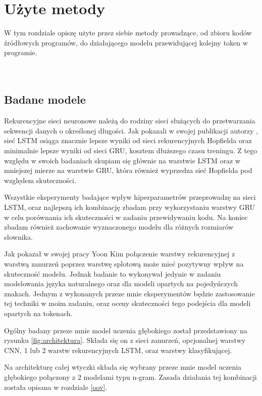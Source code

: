 \newpage %
 

\section{Użyte metody}
W tym rozdziale opiszę użyte przez siebie metody prowadzące, od zbioru kodów źródłowych programów, do działającego modelu 
przewidującej kolejny token w programie. \\\\\\ 

\subsection{Badane modele}
Rekurencyjne sieci neuronowe należą do rodziny sieci służących do przetwarzania sekwencji danych o określonej długości. Jak pokazali w swojej publikacji 
autorzy \cite{lstmvsgru}, sieć LSTM osiąga znacznie lepsze wyniki od sieci rekurencyjnych Hopfielda \cite{hopfield} oraz minimalnie lepsze wyniki 
od sieci GRU, kosztem dłuższego czasu treningu. Z tego względu w swoich badaniach skupiam się głównie na warstwie LSTM oraz w mniejszej mierze na warstwie GRU, 
która również wyprzedza sieć Hopfielda pod względem skuteczności. 

Wszystkie eksperymenty badające wpływ hiperparametrów przeprowadzę na sieci LSTM, oraz najlepszą ich kombinację 
zbadam przy wykorzystaniu warstwy GRU w celu porównania ich skuteczności w zadaniu przewidywaniu kodu. Na koniec zbadam również zachowanie wyznaczonego modelu 
dla różnych rozmiarów słownika. 

Jak pokazał w swojej pracy Yoon Kim \cite{kim} połączenie warstwy rekurencyjnej z warstwą zanurzeń poprzez warstwę splotową może mieć pozytywny wpływ na skuteczność 
modelu. Jednak badanie to wykonywał jedynie w zadaniu modelowania języka naturalnego oraz dla modeli opartych na pojedyńczych znakach. Jednym z wykonanych przeze mnie 
eksperymentów będzie zastosowanie tej techniki w moim zadaniu, oraz oceny skuteczności tego podejścia dla modeli opartych na tokenach. 

Ogólny badany przeze mnie model uczenia głębokiego został przedstawiony na rysunku \ref{fig:architektura}. Składa się on z sieci zanurzeń, opcjonalnej warstwy CNN, 1 lub 2 
warstw rekurencyjnych LSTM, oraz warstwy klasyfikującej.

Na architekturę całej wtyczki składa się wybrany przeze mnie model uczenia głębokiego połączony z 2 modelami typu n-gram. Zasada działania tej kombinacji 
została opisana w rozdziale \ref{oov}. 

